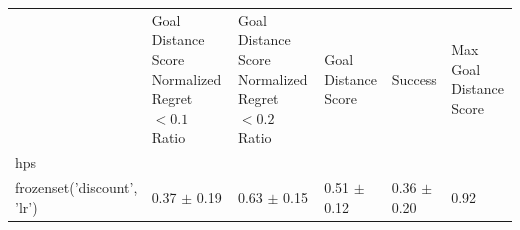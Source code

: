 \begin{tabular}{llllll}
\toprule
 & Goal Distance Score Normalized Regret $< 0.1$ Ratio & Goal Distance Score Normalized Regret $< 0.2$ Ratio & Goal Distance Score & Success & Max Goal Distance Score \\
hps &  &  &  &  &  \\
\midrule
frozenset({'discount', 'lr'}) & 0.37 $\pm$ 0.19 & 0.63 $\pm$ 0.15 & 0.51 $\pm$ 0.12 & 0.36 $\pm$ 0.20 & 0.92 \\
\bottomrule
\end{tabular}
